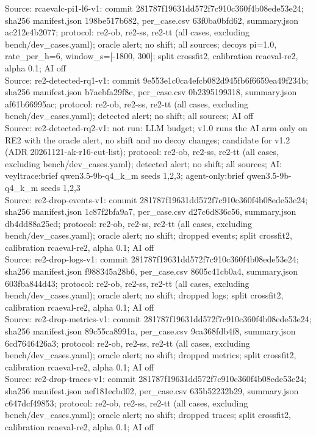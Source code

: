 \begin{table}[t]
Source: rcaevalc-pi1-l6-v1: commit 281787f19631dd572f7c910c360f4b08ede53e24; sha256 manifest.json 198be517b682, per\_case.csv 63f0ba0bfd62, summary.json ac212e4b2077; protocol: re2-ob, re2-ss, re2-tt (all cases, excluding bench/dev\_cases.yaml); oracle alert; no shift; all sources; decoys pi=1.0, rate\_per\_h=6, window\_s=[-1800, 300]; split crossfit2, calibration rcaeval-re2, alpha 0.1; AI off\\
Source: re2-detected-rq1-v1: commit 9e553e1c0ca4efcb082d945fb6f6659ea49f234b; sha256 manifest.json b7aebfa29f8c, per\_case.csv 0b2395199318, summary.json af61b66995ac; protocol: re2-ob, re2-ss, re2-tt (all cases, excluding bench/dev\_cases.yaml); detected alert; no shift; all sources; AI off\\
Source: re2-detected-rq2-v1: not run: LLM budget; v1.0 runs the AI arm only on RE2 with the oracle alert, no shift and no decoy changes; candidate for v1.2 (ADR 20261121-ak-r16-cut-list); protocol: re2-ob, re2-ss, re2-tt (all cases, excluding bench/dev\_cases.yaml); detected alert; no shift; all sources; AI: veyltrace:brief qwen3.5-9b-q4\_k\_m seeds 1,2,3; agent-only:brief qwen3.5-9b-q4\_k\_m seeds 1,2,3\\
Source: re2-drop-events-v1: commit 281787f19631dd572f7c910c360f4b08ede53e24; sha256 manifest.json 1c87f2bfa9a7, per\_case.csv d27c6d836c56, summary.json db4dd88a25ed; protocol: re2-ob, re2-ss, re2-tt (all cases, excluding bench/dev\_cases.yaml); oracle alert; no shift; dropped events; split crossfit2, calibration rcaeval-re2, alpha 0.1; AI off\\
Source: re2-drop-logs-v1: commit 281787f19631dd572f7c910c360f4b08ede53e24; sha256 manifest.json f988345a28b6, per\_case.csv 8605c41cb0a4, summary.json 603fba844d43; protocol: re2-ob, re2-ss, re2-tt (all cases, excluding bench/dev\_cases.yaml); oracle alert; no shift; dropped logs; split crossfit2, calibration rcaeval-re2, alpha 0.1; AI off\\
Source: re2-drop-metrics-v1: commit 281787f19631dd572f7c910c360f4b08ede53e24; sha256 manifest.json 89c55ca8991a, per\_case.csv 9ca368fdb4f8, summary.json 6cd7646426a3; protocol: re2-ob, re2-ss, re2-tt (all cases, excluding bench/dev\_cases.yaml); oracle alert; no shift; dropped metrics; split crossfit2, calibration rcaeval-re2, alpha 0.1; AI off\\
Source: re2-drop-traces-v1: commit 281787f19631dd572f7c910c360f4b08ede53e24; sha256 manifest.json aef181ecbd02, per\_case.csv 635b52232b29, summary.json c647dcf49853; protocol: re2-ob, re2-ss, re2-tt (all cases, excluding bench/dev\_cases.yaml); oracle alert; no shift; dropped traces; split crossfit2, calibration rcaeval-re2, alpha 0.1; AI off\\

\end{table}
